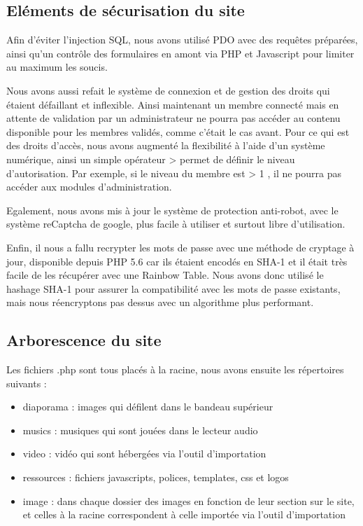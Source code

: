 \documentclass[11pt]{report}
\begin{document}
\subsection{Eléments de sécurisation du site}
Afin d'éviter l'injection SQL, nous avons utilisé PDO avec des requêtes
préparées, ainsi qu'un contrôle des formulaires en amont via PHP et Javascript
pour limiter au maximum les soucis. \\
\par Nous avons aussi refait le système de connexion et de gestion des droits
qui étaient défaillant et inflexible. Ainsi maintenant un membre connecté mais
en attente de validation par un administrateur ne pourra pas accéder au contenu
disponible pour les membres validés, comme c'était le cas avant. Pour ce qui est
des droits d'accès, nous avons augmenté la flexibilité à l'aide d'un système
numérique, ainsi un simple opérateur \og > \fg{} permet de définir le niveau
d'autorisation. Par exemple, si le niveau du membre est \og > 1 \fg{}, il ne
pourra pas accéder aux modules d'administration. \\
 \par Egalement, nous avons mis à jour le système de protection anti-robot, avec
 le système reCaptcha de google, plus facile à utiliser et surtout libre 
 d'utilisation.
 
 \par Enfin, il nous a fallu recrypter les mots de passe avec une méthode de
 cryptage à jour, disponible depuis PHP 5.6 car ils étaient encodés en SHA-1 et
 il était très facile de les récupérer avec une Rainbow Table. Nous avons donc
 utilisé le hashage SHA-1 pour assurer la compatibilité avec les mots de passe
 existants, mais nous réencryptons pas dessus avec un algorithme plus
 performant.
 
 \subsection{Arborescence du site}
 Les fichiers .php sont tous placés à la racine, nous avons ensuite les
 répertoires suivants : \\
 \begin{itemize}
   \item diaporama : images qui défilent dans le bandeau
   supérieur
   \item musics : musiques qui sont jouées dans le lecteur audio
   \item video : vidéo qui sont hébergées via l'outil d'importation
   \item ressources : fichiers javascripts, polices, templates, css et logos 
   \item image : dans chaque dossier des images en fonction de leur section sur
   le site, et celles à la racine correspondent à celle importée via l'outil
   d'importation
 \end{itemize}
 
\end{document}
